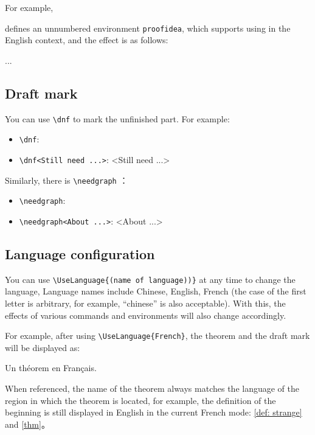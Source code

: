 \documentclass{einfart}
\begin{document}
\def\proofideanameEN{Idea}

For example,
\begin{code}
  \def\proofideanameEN{Idea}
\end{code}
defines an unnumbered environment \lstinline|proofidea|, which supports using in the English context, and the effect is as follows:

\begin{proofidea}
    ...
\end{proofidea}

\subsection{Draft mark}

You can use \lstinline|\dnf| to mark the unfinished part. For example:
\begin{itemize}
    \item \lstinline|\dnf|: \quad \dnf
    \item \lstinline|\dnf<Still need ...>|: \quad \dnf<Still need ...>
\end{itemize}

Similarly, there is \lstinline|\needgraph| ：
\begin{itemize}
    \item \lstinline|\needgraph|: \needgraph
    \item \lstinline|\needgraph<About ...>|: \needgraph<About ...>
\end{itemize}

\subsection{Language configuration}
You can use \lstinline|\UseLanguage{(name of language))}| at any time to change the language, Language names include Chinese, English, French (the case of the first letter is arbitrary, for example, ``chinese'' is also acceptable). With this, the effects of various commands and environments will also change accordingly.

For example, after using \lstinline|\UseLanguage{French}|, the theorem and the draft mark will be displayed as:

\begin{theorem}[Inutile]\label{thm}
    Un théorem en Français. \dnf
\end{theorem}

When referenced, the name of the theorem always matches the language of the region in which the theorem is located, for example, the definition of the beginning is still displayed in English in the current French mode: \cref{def: strange} and \cref{thm}。
\end{document}

